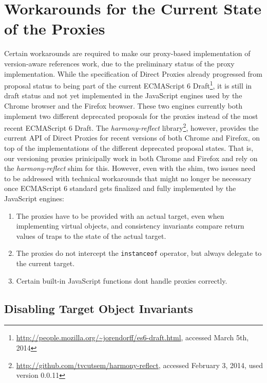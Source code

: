 \section{Workarounds for the Current State of the Proxies} \label{sec:IMPLEMENTATION:4}

Certain workarounds are required to make our proxy-based implementation of version-aware references work, due to the preliminary status of the proxy implementation.
While the specification of Direct Proxies already progressed from proposal status to being part of the current ECMAScript 6 Draft\footnote{\url{http://people.mozilla.org/~jorendorff/es6-draft.html}, accessed March 5th, 2014}, it is still in draft status and not yet implemented in the JavaScript engines used by the Chrome browser and the Firefox browser.
These two engines currently both implement two different deprecated proposals for the proxies instead of the most recent ECMAScript 6 Draft.
The \emph{harmony-reflect} library\footnote{\url{http://github.com/tvcutsem/harmony-reflect}, accessed February 3, 2014, used version 0.0.11}, however, provides the current API of Direct Proxies for recent versions of both Chrome and Firefox, on top of the implementations of the different deprecated proposal states.
That is, our versioning proxies prinicipally work in both Chrome and Firefox and rely on the \emph{harmony-reflect} shim for this.
However, even with the shim, two issues need to be addressed with technical workarounds that might no longer be necessary once ECMAScript 6 standard gets finalized and fully implemented by the JavaScript engines: 

\begin{enumerate}
    \item The proxies have to be provided with an actual target, even when implementing virtual objects, and consistency invariants compare return values of traps to the state of the actual target. 
    \item The proxies do not intercept the \lstinline{instanceof} operator, but always delegate to the current target.
    \item Certain built-in JavaScript functions dont handle proxies correctly.
\end{enumerate}


\subsection{Disabling Target Object Invariants}


